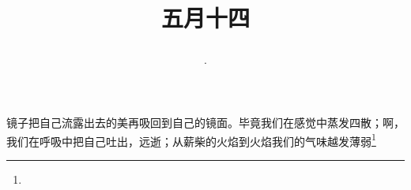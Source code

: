\title{\date[d=19,m=6,y=2024][year:cn-y,年,month:cn,day:cn,日,·,weekday]·五月十四 }
镜子把自己流露出去的美再吸回到自己的镜面。毕竟我们在感觉中蒸发四散；啊，我们在呼吸中把自己吐出，远逝；从薪柴的火焰到火焰我们的气味越发薄弱\footnote{ }

